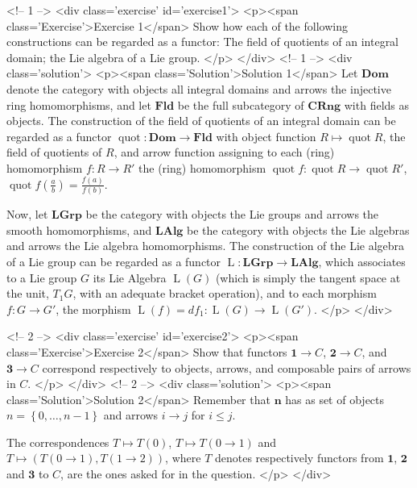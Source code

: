 <!-- 1 -->
<div class='exercise' id='exercise1'>
<p><span class='Exercise'>Exercise 1</span>
Show how each of the following constructions can be regarded as a functor: The field of quotients of an integral domain; the Lie algebra of a Lie group.
</p>
</div>
<!-- 1 -->
<div class='solution'>
<p><span class='Solution'>Solution 1</span>
Let $\mathbf{Dom}$ denote the category with objects all integral domains and arrows the injective ring homomorphisms, and let $\mathbf{Fld}$ be the full subcategory of $\mathbf{CRng}$ with fields as objects. The construction of the field of quotients of an integral domain can be regarded as a functor $\operatorname{quot}:\mathbf{Dom}\to\mathbf{Fld}$ with object function $R\mapsto \operatorname{quot}R$, the field of quotients of $R$, and arrow function assigning to each (ring) homomorphism $f:R\to R'$ the (ring) homomorphism $\operatorname{quot}f:\operatorname{quot}R\to\operatorname{quot}R'$, $\operatorname{quot}f(\frac{a}{b})=\frac{f(a)}{f(b)}$.

Now, let $\mathbf{LGrp}$ be the category with objects the Lie groups and arrows the smooth homomorphisms, and $\mathbf{LAlg}$ be the category with objects the Lie algebras and arrows the Lie algebra homomorphisms. The construction of the Lie algebra of a Lie group can be regarded as a functor $\operatorname{L}:\mathbf{LGrp}\to\mathbf{LAlg}$, which associates to a Lie group $G$ its Lie Algebra $\operatorname{L}(G)$ (which is simply the tangent space at the unit, $T_1G$, with an adequate bracket operation), and to each morphism $f:G\to G'$, the morphism $\operatorname{L}(f)=df_1:\operatorname{L}(G)\to\operatorname{L}(G')$.
</p>
</div>

<!-- 2 -->
<div class='exercise' id='exercise2'>
<p><span class='Exercise'>Exercise 2</span>
Show that functors $\mathbf{1}\to C$, $\mathbf{2}\to C$, and $\mathbf{3}\to C$ correspond respectively to objects, arrows, and composable pairs of arrows in $C$.
</p>
</div>
<!-- 2 -->
<div class='solution'>
<p><span class='Solution'>Solution 2</span>
Remember that $\mathbf{n}$ has as set of objects $n=\left\{0,\ldots,n-1\right\}$ and arrows $i\to j$ for $i\leq j$.

The correspondences $T\mapsto T(0)$, $T\mapsto T(0\to 1)$ and $T\mapsto (T(0\to 1),T(1\to 2))$, where $T$ denotes respectively functors from $\mathbf{1}$, $\mathbf{2}$ and $\mathbf{3}$ to $C$, are the ones asked for in the question.
</p>
</div>

